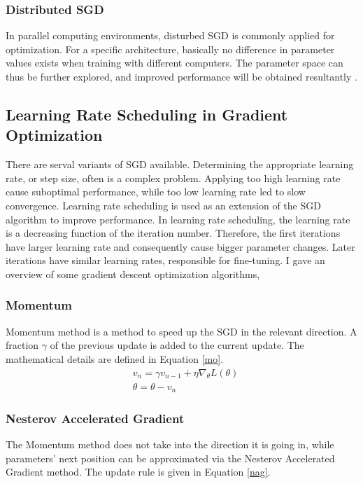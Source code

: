     \subsubsection{Distributed SGD}
    In parallel computing environments, disturbed SGD is commonly applied for optimization. For a specific architecture, basically no difference in parameter values exists when training with different computers. The parameter space can thus be further explored, and improved performance will be obtained resultantly \cite{zhang2015deep}.

    \subsection{Learning Rate Scheduling in Gradient Optimization}
    \label{learning}
    There are serval variants of SGD available. Determining the appropriate learning rate, or step size, often is a complex problem. Applying too high learning rate cause suboptimal performance, while too low learning rate led to slow convergence. Learning rate scheduling is used as an extension of the SGD algorithm to improve performance. In learning rate scheduling, the learning rate is a decreasing function of the iteration number. Therefore, the first iterations have larger learning rate and consequently cause bigger parameter changes. Later iterations have similar learning rates, responsible for fine-tuning. I gave an overview of some gradient descent optimization algorithms,

    \subsubsection{Momentum}
    Momentum method is a method to speed up the SGD in the relevant direction.  A fraction $\gamma$ of the previous update is added to the current update. The mathematical details are defined in Equation \ref{mo}.
    \begin{equation}
        \begin{aligned}
            & v_n = \gamma v_{n-1} + \eta \nabla_{\theta}L(\theta) \\
            & \theta= \theta - v_{n}
        \end{aligned}
        \label{mo}
    \end{equation} 

    \subsubsection{Nesterov Accelerated Gradient}
    The Momentum method does not take into the direction it is going in, while parameters’ next position can be approximated via the Nesterov Accelerated Gradient method. The update rule is given in Equation \ref{nag}.

